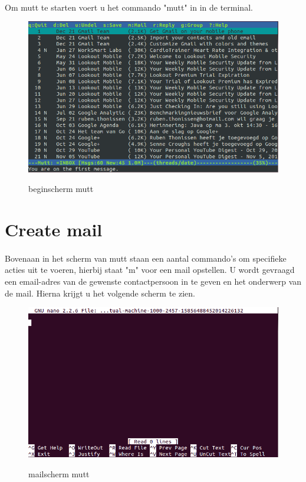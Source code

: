\documentclass[12pt,a4paper]{report}
\begin{document}
\begin{flushleft}
\paragraph*{}
Om mutt te starten voert u het commando "mutt" in in de terminal.
\begin{figure}[H]
\includegraphics[scale=0.75]{images/mutt_01.png}
\label{mutt_01}
\centering 
\vspace{-10pt}
\caption{beginscherm mutt}
\end{figure} 
\pagebreak
\section{Create mail}
\paragraph*{}
Bovenaan in het scherm van mutt staan een aantal commando's om specifieke acties uit te voeren, hierbij staat "m" voor een mail opstellen. U wordt gevraagd een email-adres van de gewenste contactpersoon in te geven en het onderwerp van de mail. Hierna krijgt u het volgende scherm te zien.
\begin{figure}[H]
\includegraphics[scale=0.75]{images/mutt_02.png}
\label{mutt_01}
\centering 
\vspace{-10pt}
\caption{mailscherm mutt}
\end{figure}

\end{flushleft}
\end{document}
